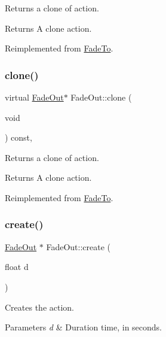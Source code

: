 Returns a clone of action.

\begin{DoxyReturn}{Returns}
A clone action. 
\end{DoxyReturn}


Reimplemented from \hyperlink{classFadeTo_a662485a4513a6e717db8df6c6065c284}{Fade\+To}.

\mbox{\label{classFadeOut_a03d1d3960ed0439bb40f120f14f1a4b5}} 
\subsubsection{\texorpdfstring{clone()}{clone()}\hspace{0.1cm}{\footnotesize\ttfamily [2/2]}}
{\footnotesize\ttfamily virtual \hyperlink{classFadeOut}{Fade\+Out}$\ast$ Fade\+Out\+::clone (\begin{DoxyParamCaption}\item[{void}]{ }\end{DoxyParamCaption}) const\hspace{0.3cm}{\ttfamily [override]}, {\ttfamily [virtual]}}

Returns a clone of action.

\begin{DoxyReturn}{Returns}
A clone action. 
\end{DoxyReturn}


Reimplemented from \hyperlink{classFadeTo_a662485a4513a6e717db8df6c6065c284}{Fade\+To}.

\mbox{\label{classFadeOut_a623198ca778e18f3dc88dea0460253ec}} 
\subsubsection{\texorpdfstring{create()}{create()}\hspace{0.1cm}{\footnotesize\ttfamily [1/2]}}
{\footnotesize\ttfamily \hyperlink{classFadeOut}{Fade\+Out} $\ast$ Fade\+Out\+::create (\begin{DoxyParamCaption}\item[{float}]{d }\end{DoxyParamCaption})\hspace{0.3cm}{\ttfamily [static]}}

Creates the action. 
\begin{DoxyParams}{Parameters}
{\em d} & Duration time, in seconds. \\
\hline
\end{DoxyParams}
\mbox{\label{classFadeOut_a38525e3cd25930cf0c95a0feeb1f8238}} 
